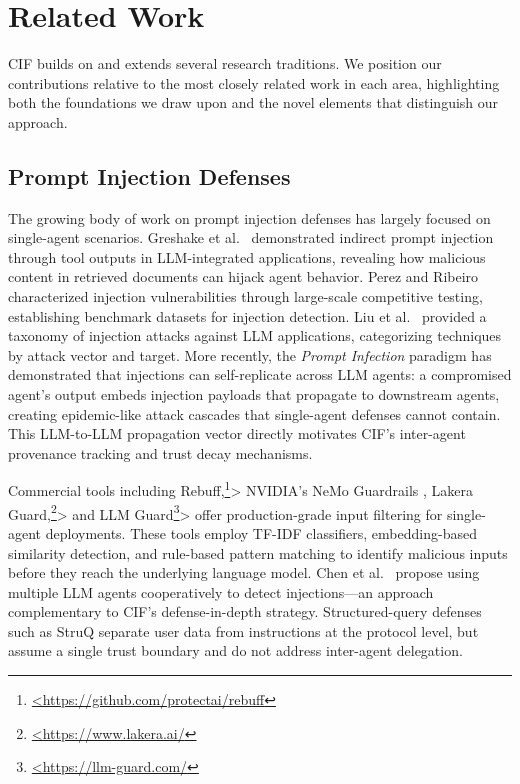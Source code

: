 \documentclass[
]{article}
\begin{document}
\newpage

\newpage

\section{Related Work}\label{sec:related-work}

CIF builds on and extends several research traditions. We position our
contributions relative to the most closely related work in each area,
highlighting both the foundations we draw upon and the novel elements
that distinguish our approach.

\subsection{Prompt Injection Defenses}\label{prompt-injection-defenses}

The growing body of work on prompt injection defenses has largely
focused on single-agent scenarios. Greshake et
al.~\cite{greshake2023indirect} demonstrated indirect prompt injection
through tool outputs in LLM-integrated applications, revealing how
malicious content in retrieved documents can hijack agent behavior.
Perez and Ribeiro \cite{perez2023hackaprompt} characterized injection
vulnerabilities through large-scale competitive testing, establishing
benchmark datasets for injection detection. Liu et
al.~\cite{liu2023prompt} provided a taxonomy of injection attacks
against LLM applications, categorizing techniques by attack vector and
target. More recently, the \emph{Prompt Infection} paradigm
\cite{lee2025promptinfection} has demonstrated that injections can
self-replicate across LLM agents: a compromised agent's output embeds
injection payloads that propagate to downstream agents, creating
epidemic-like attack cascades that single-agent defenses cannot contain.
This LLM-to-LLM propagation vector directly motivates CIF's inter-agent
provenance tracking and trust decay mechanisms.

Commercial tools including
Rebuff,\footnote{\url{<https://github.com/protectai/rebuff}}\textgreater{}
NVIDIA's NeMo Guardrails \cite{rebedea2023nemo}, Lakera
Guard,\footnote{\url{<https://www.lakera.ai/}}\textgreater{} and LLM
Guard\footnote{\url{<https://llm-guard.com/}}\textgreater{} offer
production-grade input filtering for single-agent deployments. These
tools employ TF-IDF classifiers, embedding-based similarity detection,
and rule-based pattern matching to identify malicious inputs before they
reach the underlying language model. Chen et
al.~\cite{multiagent2025defense} propose using multiple LLM agents
cooperatively to detect injections---an approach complementary to CIF's
defense-in-depth strategy. Structured-query defenses such as StruQ
\cite{struq2025} separate user data from instructions at the protocol
level, but assume a single trust boundary and do not address inter-agent
delegation.
\end{document}
